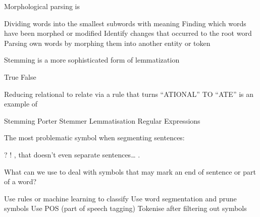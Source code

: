 \documentclass[theme=sleek, randomorder, hidesidemenu]{webquiz}
\begin{document}
\begin{question}

  Morphological parsing is

  \begin{choice}[columns=2]
    \correct Dividing words into the smallest subwords with meaning
    \incorrect Finding which words have been morphed or modified
    \incorrect Identify changes that occurred to the root word
    \incorrect Parsing own words by morphing them into another entity or token
  \end{choice}

\end{question}

\begin{question}

  Stemming is a more sophisticated form of lemmatization

  \begin{choice}[columns]
    \incorrect True
    \correct False
  \end{choice}

\end{question}

\begin{question}

  Reducing relational to relate via a rule that turns ``ATIONAL'' TO ``ATE'' is an example of

  \begin{choice}[columns=2]
    \incorrect Stemming
    \correct Porter Stemmer
    \incorrect Lemmatisation
    \incorrect Regular Expressions
  \end{choice}

\end{question}

\begin{question}

  The most problematic symbol when segmenting sentences:

  \begin{choice}[columns=2]
    \incorrect ?
    \incorrect !
    \incorrect , \feedback that doesn't even separate sentences\ldots
    \correct .
  \end{choice}
\end{question}

\begin{question}

  What can we use to deal with symbols that may mark an end of sentence or part of a word?

  \begin{choice}
    \correct Use rules or machine learning to classify
    \incorrect Use word segmentation and prune symbols
    \incorrect Use POS (part of speech tagging)
    \incorrect Tokenise after filtering out symbols
  \end{choice}

\end{question}
\end{document}
